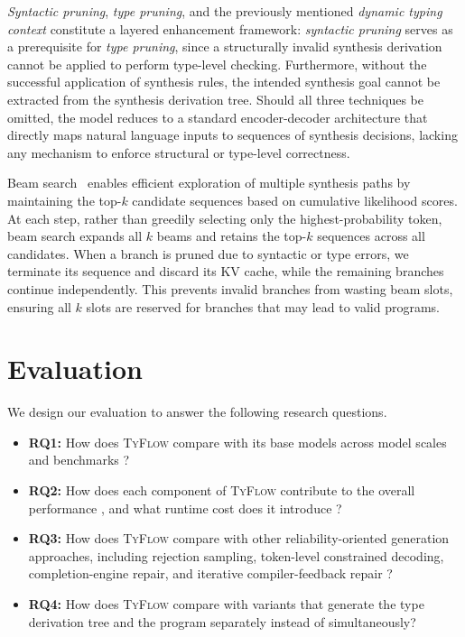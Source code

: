 \documentclass[manuscript,screen]{acmart}
\newcommand{\toolname}[1]{\textsc{#1}}
\newcommand{\mainname}{\toolname{TyFlow}\xspace}
\begin{document}
\emph{Syntactic pruning}, \emph{type pruning}, and the previously mentioned \emph{dynamic typing context} constitute a layered enhancement framework: 
\emph{syntactic pruning} serves as a prerequisite for \emph{type pruning}, since a structurally invalid synthesis derivation cannot be applied to perform type-level checking. 
Furthermore, without the successful application of synthesis rules, the intended synthesis goal cannot be extracted from the synthesis derivation tree. 
Should all three techniques be omitted, the model reduces to a standard encoder-decoder architecture that directly maps natural language inputs to sequences of synthesis decisions, lacking any mechanism to enforce structural or type-level correctness.

Beam search~\cite{DBLP:conf/aclnmt/FreitagA17} enables efficient exploration of multiple synthesis paths by maintaining the top-$k$ candidate sequences based on cumulative likelihood scores. At each step, rather than greedily selecting only the highest-probability token, beam search expands all $k$ beams and retains the top-$k$ sequences across all candidates.
When a branch is pruned due to syntactic or type errors, we terminate its sequence and discard its KV cache, while  {\color{revblue}the } remaining branches continue independently. This prevents invalid branches from wasting beam slots, ensuring all $k$ slots are reserved for branches that may lead to valid programs.
\section{Evaluation \label{sec:evaluation}}
We design our evaluation to answer the following research questions.
\begin{itemize}
    \item \textbf{RQ1:} How does \mainname compare with    {\color{revblue}its base models across model scales and benchmarks} ?
    \item \textbf{RQ2:} How does each component of \mainname contribute   to the overall performance {\color{revblue}, and what runtime cost does it introduce} ?
    \item \textbf{RQ3:} How does   \mainname compare with  {\color{revblue}other reliability-oriented generation approaches, including } rejection sampling,    {\color{revblue}token-level constrained decoding, completion-engine repair, and iterative compiler-feedback repair} ?
    \item \textbf{RQ4:} How does \mainname compare with variants that generate the type derivation tree and the program separately instead of simultaneously?
\end{itemize}
\end{document}
